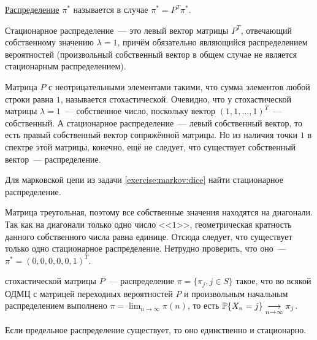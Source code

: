 \begin{definition}
    \label{definition:markov:stationary_distribution}
    \uline{Распределение} $ \pi^* $ называется  в случае $ \pi^* = P^T \pi^* $.
\end{definition}

Стационарное распределение~--- это левый вектор матрицы $ P^T $,
отвечающий собственному значению $ \lambda = 1 $,
причём обязательно являющийся распределением вероятностей
(произвольный собственный вектор в общем случае не является стационарным распределением).

Матрица $ P $ с неотрицательными элементами такими,
что сумма элементов любой строки равна $ 1 $, называется стохастической.
Очевидно, что у стохастической матрицы $ \lambda = 1 $~--- собственное число,
поскольку вектор $ (1, 1, \ldots, 1)^T $~--- собственный.
А стационарное распределение~--- левый собственный вектор,
то есть правый собственный вектор сопряжённой матрицы.
Но из наличия точки $ 1 $ в спектре этой матрицы, конечно, ещё не следует,
что существует собственный вектор~--- распределение.

\begin{exercise}
    \label{exercise:markov:stationary_dice}
    Для марковской цепи из задачи \ref{exercise:markov:dice} найти стационарное распределение.
\end{exercise}

\begin{solution}
    Матрица треугольная, поэтому все собственные значения находятся на диагонали.
    Так как на диагонали только одно число <<$ 1 $>>,
    геометрическая кратность данного собственного числа равна единице.
    Отсюда следует, что существует только одно стационарное распределение.
    Нетрудно проверить, что оно~--- $ \pi^* = (0,0,0,0,0,1)^T $.
\end{solution}

\begin{definition}
    \label{definition:markov:limit_distribution}
     стохастической матрицы $ P $~---
    распределение $ \pi = \{\pi_j, j \in S\} $ такое,
    что во всякой ОДМЦ с матрицей переходных вероятностей $ P $
    и произвольным начальным распределением выполнено $ \pi = \lim_{n \to \infty} \pi(n) $,
    то есть $ \mathbb{P} \{X_n = j\} \underset{n \rightarrow \infty}{\longrightarrow} \pi_j $.
\end{definition}

\begin{statement}
    \label{statement:markov:limit_implies_stationary}
    Если предельное распределение существует,
    то оно единственно и стационарно.
\end{statement}

